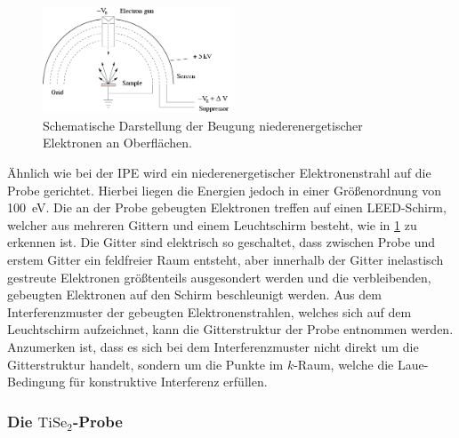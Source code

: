 \begin{figure}[!ht]
    \centering
    \includegraphics[width=0.5\textwidth]{img/leed_theo.png}
    \caption{Schematische Darstellung der Beugung niederenergetischer Elektronen an Oberflächen.\cite{leed_theo}}
    \label{fig_leed_theo}
\end{figure}

Ähnlich wie bei der IPE wird ein niederenergetischer Elektronenstrahl auf die Probe gerichtet.
Hierbei liegen die Energien jedoch in einer Größenordnung von \SI{100}{\electronvolt}\cite{wiki_leed}.
Die an der Probe gebeugten Elektronen treffen auf einen LEED-Schirm, welcher aus mehreren Gittern und einem Leuchtschirm besteht, wie in \cref{fig_leed_theo} zu erkennen ist.
Die Gitter sind elektrisch so geschaltet, dass zwischen Probe und erstem Gitter ein feldfreier Raum entsteht, aber innerhalb der Gitter inelastisch gestreute Elektronen größtenteils ausgesondert werden und die verbleibenden, gebeugten Elektronen auf den Schirm beschleunigt werden.
Aus dem Interferenzmuster der gebeugten Elektronenstrahlen, welches sich auf dem Leuchtschirm aufzeichnet, kann die Gitterstruktur der Probe entnommen werden.
Anzumerken ist, dass es sich bei dem Interferenzmuster nicht direkt um die Gitterstruktur handelt, sondern um die Punkte im $k$-Raum, welche die Laue-Bedingung für konstruktive Interferenz erfüllen.

\subsubsection{\texorpdfstring{Die $\text{TiSe}_2$-Probe}{Die TiSe2-Probe}}

